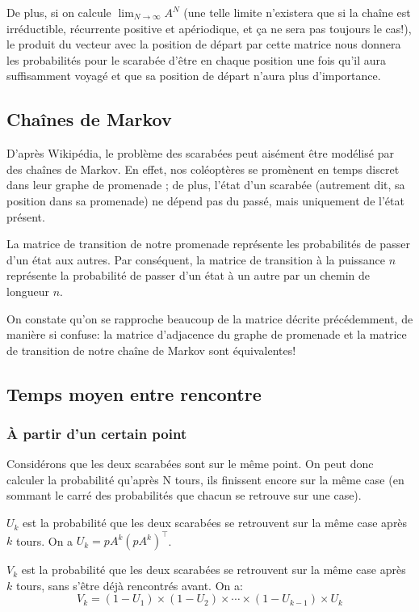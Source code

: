 \documentclass{scrartcl}
\begin{document}
  De plus, si on calcule $\lim_{N \to \infty} A^N$ (une telle limite n'existera
  que si la chaîne est irréductible, récurrente positive et apériodique, et ça
  ne sera pas toujours le cas!), le produit du vecteur avec la position de
  départ par cette matrice nous donnera les probabilités pour le scarabée
  d'être en chaque position une fois qu'il aura suffisamment voyagé et que sa
  position de départ n'aura plus d'importance.

  \subsection{Chaînes de Markov}
    D'après Wikipédia, le problème des scarabées peut aisément être modélisé
    par des chaînes de Markov. En effet, nos coléoptères se promènent en temps
    discret dans leur graphe de promenade ; de plus, l'état d'un scarabée
    (autrement dit, sa position dans sa promenade) ne dépend pas du passé, mais
    uniquement de l'état présent.

    La matrice de transition de notre promenade représente les probabilités de
    passer d'un état aux autres. Par conséquent, la matrice de transition à la
    puissance $n$ représente la probabilité de passer d'un état à un autre par
    un chemin de longueur $n$.

    On constate qu'on se rapproche beaucoup de la matrice décrite précédemment,
    de manière si confuse: la matrice d'adjacence du graphe de promenade et la
    matrice de transition de notre chaîne de Markov sont équivalentes!

  \subsection{Temps moyen entre rencontre}
    \subsubsection{À partir d'un certain point}
      Considérons que les deux scarabées sont sur le même point.  On peut donc
      calculer la probabilité qu'après N tours, ils finissent encore sur la
      même case (en sommant le carré des probabilités que chacun se retrouve
      sur une case).

      $U_k$ est la probabilité que les deux scarabées se retrouvent sur la même
      case après $k$ tours. On a $U_k = pA^k(pA^k)^\intercal$.

      $V_k$ est la probabilité que les deux scarabées se retrouvent sur la même
      case après $k$ tours, sans s'être déjà rencontrés avant. On a:
        $$V_k = (1 - U_1) \times (1 - U_2) \times \cdots \times (1 - U_{k - 1})
        \times U_k$$
\end{document}
